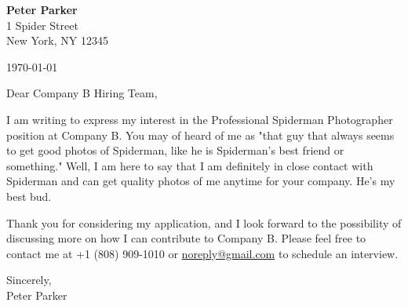 \documentclass[12pt,a4paper]{article}
\newcommand{\company}{Company B}
\newcommand{\position}{Professional Spiderman Photographer}
\begin{document}
\begin{flushleft}
\textbf{Peter Parker}\\
1 Spider Street\\
New York, NY 12345\\
\end{flushleft}
\begin{flushright}
\today
\end{flushright}

\begin{flushleft}
    Dear \company{} Hiring Team,
\end{flushleft}

\vspace{0.5em}

\begin{flushleft}

I am writing to express my interest in the \position{} position at \company. You may of heard of me as "that guy that always seems to get good photos of Spiderman, like he is Spiderman's best friend or something." Well, I am here to say that I am definitely in close contact with Spiderman and can get quality photos of me anytime for your company. He's my best bud.
\vspace{1em}

Thank you for considering my application, and I look forward to the possibility of discussing more on how I can contribute to \company. 
Please feel free to contact me at +1 (808) 909-1010 or 
\href{mailto://noreply@gmail.com}{noreply@gmail.com} to schedule an interview.
\end{flushleft}

\vspace{1em}
\begin{flushleft}
Sincerely, \\[3em]
Peter Parker
\end{flushleft}
\end{document}
